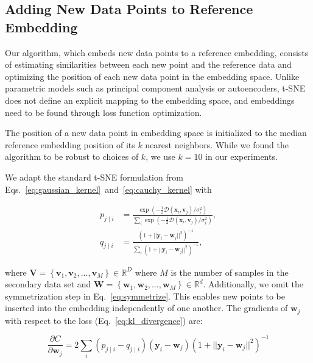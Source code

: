 \documentclass[runningheads]{llncs}
\begin{document}
\subsection{Adding New Data Points to Reference Embedding\label{sec:transfer}}

Our algorithm, which embeds new data points to a reference embedding, consists
of estimating similarities between each new point and the reference data and
optimizing the position of each new data point in the embedding space. Unlike
parametric models such as principal component analysis or autoencoders, t-SNE
does not define an explicit mapping to the embedding space, and embeddings need
to be found through loss function optimization.

The position of a new data point in embedding space is initialized to the median
reference embedding position of its $k$ nearest neighbors. While we found the
algorithm to be robust to choices of $k$, we use $k=10$ in our experiments.

We adapt the standard t-SNE formulation from
Eqs.~\ref{eq:gaussian_kernel}~and~\ref{eq:cauchy_kernel} with

\begin{align}
p_{j \mid i} &= \frac{\exp \left ( -\frac{1}{2} \mathcal{D}(\mathbf{x}_i, \mathbf{v}_j) / \sigma_i^2 \right )}{\sum_{i} \exp \left ( -\frac{1}{2} \mathcal{D}(\mathbf{x}_i, \mathbf{v}_j) / \sigma_i^2 \right )}, \\
q_{j \mid i} &= \frac{\left ( 1 + || \mathbf{y}_i - \mathbf{w}_j ||^2 \right )^{-1}}{\sum_{i}\left ( 1 + || \mathbf{y}_i - \mathbf{w}_j ||^2 \right )^{-1}},
\end{align}

\noindent where $\mathbf{V} = \left \{ \mathbf{v}_1, \mathbf{v}_2, \dots,
\mathbf{v}_M \right \} \in \mathbb{R}^D$ where $M$ is the number of samples in
the secondary data set and $\mathbf{W} = \left \{ \mathbf{w}_1, \mathbf{w}_2, \dots,
\mathbf{w}_M \right \} \in \mathbb{R}^d$. Additionally, we omit the
symmetrization step in Eq.~\ref{eq:symmetrize}. This enables new points to be
inserted into the embedding independently of one another. The gradients of
$\mathbf{w}_j$ with respect to the loss (Eq.~\ref{eq:kl_divergence}) are:

\begin{equation}
\frac{\partial C}{\partial \mathbf{w}_j} = 2 \sum_i \left ( p_{j \mid i} - q_{j \mid i} \right ) \left ( \mathbf{y}_i - \mathbf{w}_j \right ) \left ( 1 + || \mathbf{y}_i - \mathbf{w}_j || ^2 \right )^{-1}
\label{eq:gradient}
\end{equation}
\end{document}
